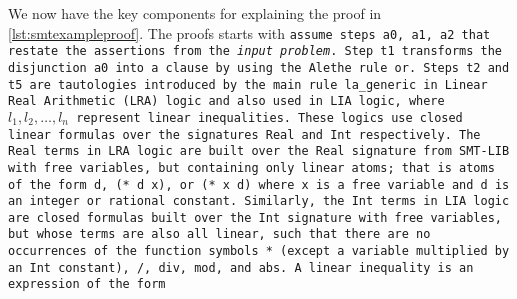 We now have the key components for explaining the proof in \cref{lst:smtexampleproof}.
The proofs starts with \tt{assume} steps \tt{a0}, \tt{a1}, \tt{a2} that restate the assertions from the \emph{input problem}. %
Step \tt{t1} transforms the disjunction \texttt{a0} into a clause by using the Alethe rule \tt{or}.
Steps \tt{t2} and \tt{t5} are tautologies introduced by the main rule \tt{la\_generic}
in Linear Real Arithmetic (LRA) logic and also used in LIA logic, where \colorbox{green!30}{$l_1, l_2,\dots, l_n$} represent linear inequalities.
These logics use closed linear formulas over the signatures \lstinline[language=SMT,basicstyle=\ttfamily\footnotesize]{Real} and \lstinline[language=SMT,basicstyle=\ttfamily\footnotesize]{Int} respectively.
The \lstinline[language=SMT,basicstyle=\ttfamily\footnotesize]{Real} terms in \tt{LRA} logic are built over the \lstinline[language=SMT,basicstyle=\ttfamily\footnotesize]{Real} signature from SMT-LIB with free variables, but containing only linear atoms; that is
atoms of the form \lstinline[language=SMT,basicstyle=\ttfamily\footnotesize]{d}, \lstinline[language=SMT,basicstyle=\ttfamily\footnotesize]{(* d x)}, or \lstinline[language=SMT,basicstyle=\ttfamily\footnotesize]{(* x d)}  where \lstinline[language=SMT,basicstyle=\ttfamily\footnotesize]{x} is a free variable and  \lstinline[language=SMT,basicstyle=\ttfamily\footnotesize]{d} is an integer or rational constant.
Similarly, the \lstinline[language=SMT,basicstyle=\ttfamily\footnotesize]{Int} terms in \tt{LIA} logic are closed formulas built over the
\lstinline[language=SMT,basicstyle=\ttfamily\footnotesize]{Int} signature with free variables, but whose terms are also all linear, such that there are no occurrences of the function symbols \lstinline[language=SMT,basicstyle=\ttfamily\footnotesize]{*} (except a variable multiplied by an \lstinline[language=SMT,basicstyle=\ttfamily\footnotesize]{Int} constant), \lstinline[language=SMT,basicstyle=\ttfamily\footnotesize]{/}, \lstinline[language=SMT,basicstyle=\ttfamily\footnotesize]{div}, \lstinline[language=SMT,basicstyle=\ttfamily\footnotesize]{mod}, and \lstinline[language=SMT,basicstyle=\ttfamily\footnotesize]{abs}.
A linear inequality is an expression of the form

